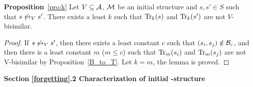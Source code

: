 \documentclass{article}
\begin{document}
 \noindent\textbf{Proposition}~\ref{pro:k}   Let $V\subseteq {\cal A}$, ${\cal M}$ be an initial structure and $s,s'\in S$
   such that $s\not\leftrightarrow_V s'$.
   There exists a least  $k$ such that
   $\textrm{Tr}_k(s)$ and $\textrm{Tr}_k(s')$ are not $V$-bisimilar.
 \begin{proof}
 If $s\not\leftrightarrow_V s'$, then there exists a least constant $c$ such that $(s_i, s_j) \notin {\cal B}_c$, and then there is a least constant $m$ ($m \leq c$) such that $\textrm{Tr}_m(s_i)$ and $\textrm{Tr}_m(s_j)$ are not V-bisimilar by Proposition~\ref{B_to_T}. Let $k=m$, the lemma is proved.
 \end{proof}






 \noindent\textbf{Section \ref{forgetting}.2  Characterization of initial \MPK-structure}\\
\end{document}
